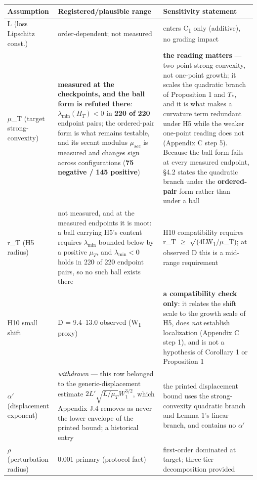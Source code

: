 \documentclass[pdflatex,sn-mathphys-ay]{sn-jnl}
\begin{document}
{\footnotesize
\setlength{\tabcolsep}{4pt}
\begin{longtable}{p{}p{}p{}}
\toprule
Assumption & Registered/plausible range & Sensitivity statement \\
\midrule
\endhead
L (loss Lipschitz const.) & order-dependent; not measured & enters C\textsubscript{1} only (additive), no grading impact \\
\ensuremath{\mu}\_T (target strong-convexity) & \textbf{measured at the checkpoints, and the ball form is refuted there}: $\lambda_{\min}(H_T)<0$ in \textbf{220 of 220} endpoint pairs; the ordered-pair form is what remains testable, and its secant modulus $\mu_{sec}$ is measured and changes sign across configurations (\textbf{75 negative / 145 positive}) & \textbf{the reading matters} --- two-point strong convexity, not one-point growth; it scales the quadratic branch of Proposition 1 and $T_*$, and it is what makes a curvature term redundant under H5 while the weaker one-point reading does not (Appendix C step 5). Because the ball form fails at every measured endpoint, \S{}4.2 states the quadratic branch under the \textbf{ordered-pair} form rather than under a ball \\
r\_T (H5 radius) & not measured, and at the measured endpoints it is moot: a ball carrying H5's content requires $\lambda_{\min}$ bounded below by a positive $\mu_T$, and $\lambda_{\min}<0$ holds in 220 of 220 endpoint pairs, so no such ball exists there & H10 compatibility requires r\_T \ensuremath{\geq} \ensuremath{\surd}(4LW\textsubscript{1}/\ensuremath{\mu}\_T); at observed D this is a mid-range requirement \\
H10 small shift & D = 9.4--13.0 observed (W\textsubscript{1} proxy) & \textbf{a compatibility check only}: it relates the shift scale to the growth scale of H5, does \emph{not} establish localization (Appendix C step 1), and is not a hypothesis of Corollary 1 or Proposition 1 \\
\ensuremath{\alpha}\ensuremath{'} (displacement exponent) & \emph{withdrawn} --- this row belonged to the generic-displacement estimate $2L'\sqrt{L/\mu_T}W_1^{3/2}$, which Appendix J.4 removes as never the lower envelope of the printed bound; a historical entry & the printed displacement bound uses the strong-convexity quadratic branch and Lemma 1's linear branch, and contains no \ensuremath{\alpha}\ensuremath{'} \\
\ensuremath{\rho} (perturbation radius) & 0.001 primary (protocol fact) & first-order dominated at target; three-tier decomposition provided \\

\end{longtable}}
\end{document}
